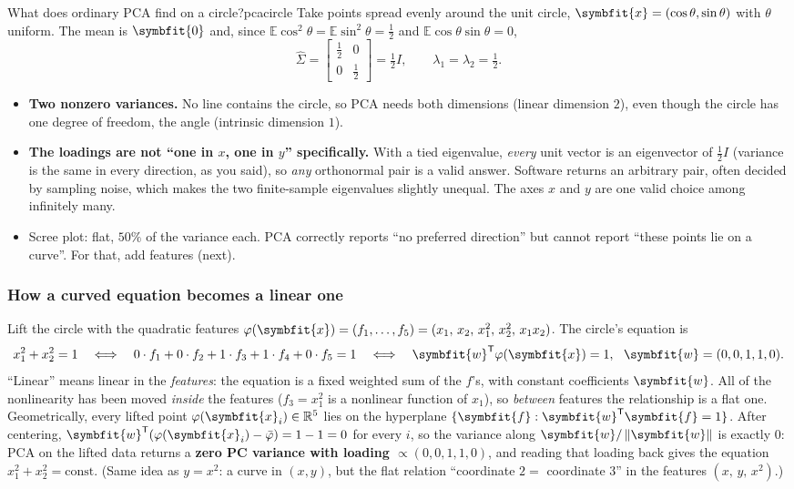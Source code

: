 \documentclass[11pt]{article}
\newcommand{\bm}[1]{\symbfit{#1}}
\newcommand{\R}{\mathbb{R}}
\newcommand{\vx}{\bm{x}}
\newcommand{\vw}{\bm{w}}
\newcommand{\Sig}{\widehat{\Sigma}}
\newcommand{\T}{^{\mathsf T}}
\newcommand{\norm}[1]{\left\lVert #1\right\rVert}
\begin{document}
\begin{example}{What does ordinary PCA find on a circle?}{pcacircle}
Take points spread evenly around the unit circle, $\vx=(\cos\theta,\sin\theta)$ with $\theta$ uniform. The mean is $\bm0$ and,
since $\mathbb E\cos^2\theta=\mathbb E\sin^2\theta=\tfrac12$ and $\mathbb E\cos\theta\sin\theta=0$,
\[
\Sig=\begin{bmatrix}\tfrac12&0\\0&\tfrac12\end{bmatrix}=\tfrac12I,\qquad \lambda_1=\lambda_2=\tfrac12 .
\]
\begin{itemize}[nosep]
\item \textbf{Two nonzero variances.} No line contains the circle, so PCA needs both dimensions (linear dimension $2$),
even though the circle has one degree of freedom, the angle (intrinsic dimension $1$).
\item \textbf{The loadings are not ``one in $x$, one in $y$'' specifically.} With a tied eigenvalue, \emph{every} unit vector is an
eigenvector of $\tfrac12I$ (variance is the same in every direction, as you said), so \emph{any} orthonormal pair is a valid
answer. Software returns an arbitrary pair, often decided by sampling noise, which makes the two finite-sample
eigenvalues slightly unequal. The axes $x$ and $y$ are one valid choice among infinitely many.
\item Scree plot: flat, $50\%$ of the variance each. PCA correctly reports ``no preferred direction'' but cannot report
``these points lie on a curve''. For that, add features (next).
\end{itemize}
\end{example}

\subsubsection*{How a curved equation becomes a linear one}

Lift the circle with the quadratic features $\varphi(\vx)=(f_1,\dots,f_5)=(x_1,\,x_2,\,x_1^2,\,x_2^2,\,x_1x_2)$. The circle's equation is
\[
x_1^2+x_2^2=1\quad\Longleftrightarrow\quad 0\cdot f_1+0\cdot f_2+1\cdot f_3+1\cdot f_4+0\cdot f_5=1\quad\Longleftrightarrow\quad \vw\T\varphi(\vx)=1,\ \ \vw=(0,0,1,1,0).
\]
``Linear'' means linear in the \emph{features}: the equation is a fixed weighted sum of the $f$'s, with constant coefficients
$\vw$. All of the nonlinearity has been moved \emph{inside} the features ($f_3=x_1^2$ is a nonlinear function of $x_1$), so
\emph{between} features the relationship is a flat one. Geometrically, every lifted point $\varphi(\vx_i)\in\R^5$ lies on the
hyperplane $\{\bm f:\vw\T\bm f=1\}$. After centering, $\vw\T(\varphi(\vx_i)-\bar\varphi)=1-1=0$ for every $i$, so the variance along
$\vw/\norm{\vw}$ is exactly $0$: PCA on the lifted data returns a \textbf{zero PC variance with loading
$\propto(0,0,1,1,0)$}, and reading that loading back gives the equation $x_1^2+x_2^2=\text{const}$. (Same idea as $y=x^2$: a
curve in $(x,y)$, but the flat relation ``coordinate $2=$ coordinate $3$'' in the features $(x,\,y,\,x^2)$.)
\end{document}
